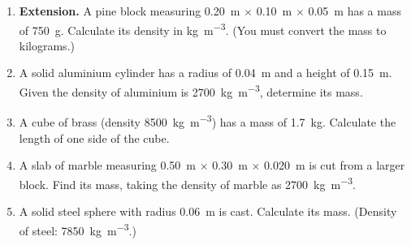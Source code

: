 \documentclass[11pt]{article}
\begin{document}
\begin{enumerate}
\item \textbf{Extension.} A pine block measuring \SI{0.20}{\metre} $\times$ \SI{0.10}{\metre} $\times$ \SI{0.05}{\metre} has a mass of \SI{750}{\gram}. Calculate its density in \si{\kilogram\per\metre\cubed}. (You must convert the mass to kilograms.)
\item A solid aluminium cylinder has a radius of \SI{0.04}{\metre} and a height of \SI{0.15}{\metre}. Given the density of aluminium is \SI{2700}{\kilogram\per\metre\cubed}, determine its mass.
\item A cube of brass (density \SI{8500}{\kilogram\per\metre\cubed}) has a mass of \SI{1.7}{\kilogram}. Calculate the length of one side of the cube.
\item A slab of marble measuring \SI{0.50}{\metre} $\times$ \SI{0.30}{\metre} $\times$ \SI{0.020}{\metre} is cut from a larger block. Find its mass, taking the density of marble as \SI{2700}{\kilogram\per\metre\cubed}.
\item A solid steel sphere with radius \SI{0.06}{\metre} is cast. Calculate its mass. (Density of steel: \SI{7850}{\kilogram\per\metre\cubed}.)
\end{enumerate}

\newpage
\end{document}
